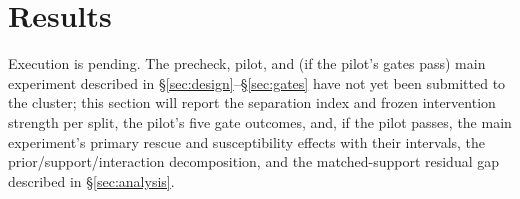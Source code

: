 \section{Results}
\label{sec:results}
Execution is pending. The precheck, pilot, and (if the pilot's gates pass) main experiment described in \S\ref{sec:design}--\S\ref{sec:gates} have not yet been submitted to the cluster; this section will report the separation index and frozen intervention strength per split, the pilot's five gate outcomes, and, if the pilot passes, the main experiment's primary rescue and susceptibility effects with their intervals, the prior/support/interaction decomposition, and the matched-support residual gap described in \S\ref{sec:analysis}.
